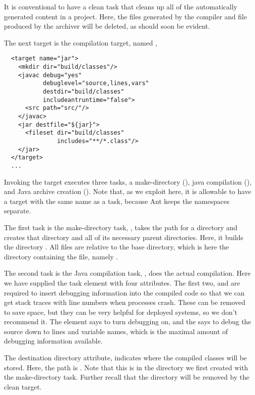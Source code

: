 It is conventional to have a clean task that cleans up all of
the automatically generated content in a project.  Here, the
 files generated by the compiler and 
file produced by the archiver will be deleted, as should soon be
evident.

The next target is the compilation target, named ,

\begin{verbatim}
  <target name="jar">
    <mkdir dir="build/classes"/>
    <javac debug="yes"
           debuglevel="source,lines,vars"
           destdir="build/classes"
           includeantruntime="false">
      <src path="src/"/>
    </javac>
    <jar destfile="${jar}">
      <fileset dir="build/classes"
               includes="**/*.class"/>
    </jar>
  </target>
  ...
\end{verbatim}
%
Invoking the  target executes three tasks, a make-directory
(), java compilation (), and Java archive
creation ().  Note that, as we exploit here, it is
allowable to have a target with the same name as a task, because Ant
keeps the namespaces separate.

The first task is the make-directory task, , takes the path for a directory and creates
that directory and all of its necessary parent directories.  Here,
it builds the directory .  All files are
relative to the base directory, which is here the directory containing
the  file, namely .

The second task is the Java compilation task, , does the
actual compilation.  Here we have supplied the task element with four
attributes.  The first two,  and  are
required to insert debugging information into the compiled code so
that we can get stack traces with line numbers when processes crash.
These can be removed to save space, but they can be very helpful for
deployed systems, so we don't recommend it.  The  element
says to turn debugging on, and the  says to debug the
source down to lines and variable names, which is the maximal amount
of debugging information available.

The destination directory attribute,  indicates where
the compiled classes will be stored.  Here, the path is .
Note that this is in the directory we first created with the
make-directory task.  Further recall that the  directory
will be removed by the clean target.

